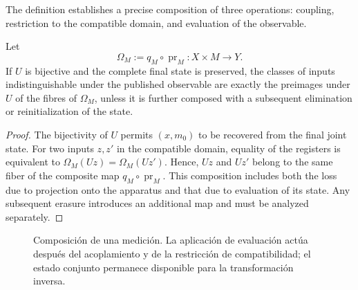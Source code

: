 The definition establishes a precise composition of three operations:
coupling, restriction to the compatible domain, and evaluation of the observable.

\begin{theorem}
Let
\[
 \Omega_M:=q_M\circ\operatorname{pr}_M:X\times M\longrightarrow Y.
\]
If \(U\) is bijective and the complete final state is preserved, the classes of
inputs indistinguishable under the published observable are exactly the
preimages under \(U\) of the fibres of \(\Omega_M\), unless it is further
composed with a subsequent elimination or reinitialization of the state.
\end{theorem}
\begin{proof}
The bijectivity of \(U\) permits \((x,m_0)\) to be recovered from the final
joint state. For two inputs \(z,z'\) in the compatible domain, equality of the
registers is equivalent to
\(\Omega_M(Uz)=\Omega_M(Uz')\). Hence, \(Uz\) and \(Uz'\) belong to the
same fiber of the composite map \(q_M\circ\operatorname{pr}_M\). This
composition includes both the loss due to projection onto the apparatus and
that due to evaluation of its state. Any subsequent erasure introduces an
additional map and must be analyzed separately.
\end{proof}

\begin{figure}[htbp]
\centering
{}
\caption{Composición de una medición. La aplicación de evaluación actúa
después del acoplamiento y de la restricción de compatibilidad; el estado
conjunto permanece disponible para la transformación inversa.}
\label{p12-83-c16-s1:fig:medicion}
\end{figure}

